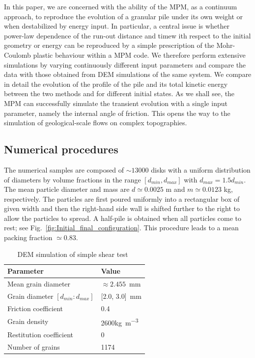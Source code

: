 In this paper, we are concerned with the ability of the MPM, as a continuum 
approach, to reproduce the evolution of a granular pile 
under its own weight or when destabilized by energy input. In particular, 
a central issue is whether power-law dependence of the run-out distance 
and timew ith respect to the initial geometry or energy can be reproduced 
by a simple prescription of the Mohr-Coulomb plastic behaviour within a  
MPM code. We therefore perform extensive simulations by varying continuously 
different input parameters and compare the data with those obtained from 
DEM simulations of the same system. We compare in detail the evolution of 
the profile of the pile and its total kinetic energy between the two methods 
and for different initial states. As we shall see, the MPM can successfully 
simulate the transient evolution with a single input parameter, namely the 
internal angle of friction. This opens the way to the simulation of 
geological-scale flows on complex topographies.  
  

\subsection{Numerical procedures}
\label{sec:num}

The numerical samples are composed of $\sim13000$ disks with a uniform 
distribution of diameters by volume fractions in the range $[d_{min}, 
d_{max}]$ with $d_{max} = 1.5 d_{min}$. The mean particle diameter and 
mass are $d\simeq 0.0025 $ m and $m\simeq 0.0123$ kg, respectively. 
The particles are first poured uniformly into a rectangular box of given width 
and then the right-hand side wall is shifted further to the right to allow the 
particles to spread. A half-pile is obtained when all particles come to 
rest; see Fig.~\cref{fig:Initial_final_configuration}. This procedure leads to 
a 
mean packing fraction $\simeq 0.83$.



\begin{table}[tbhp]
\caption{DEM simulation of simple shear test~\citep{Mutabaruka2013}}
\label{table:CD_Shear}
\centering
\begin{tabular}{ll}
\toprule
\textbf{Parameter} & \textbf{Value} \\ \midrule
Mean grain diameter & $\approx 2.455$~\si{\mm} \\
Grain diameter $[d_{min}:d_{max}]$ & [2.0, 3.0]~\si{\mm} \\
Friction coefficient & 0.4\\
Grain density & 2600\si{\kg\per\meter\cubed} \\
Restitution coefficient  & $0$\\
Number of grains & 1174 \\
\bottomrule
\end{tabular}
\end{table}


